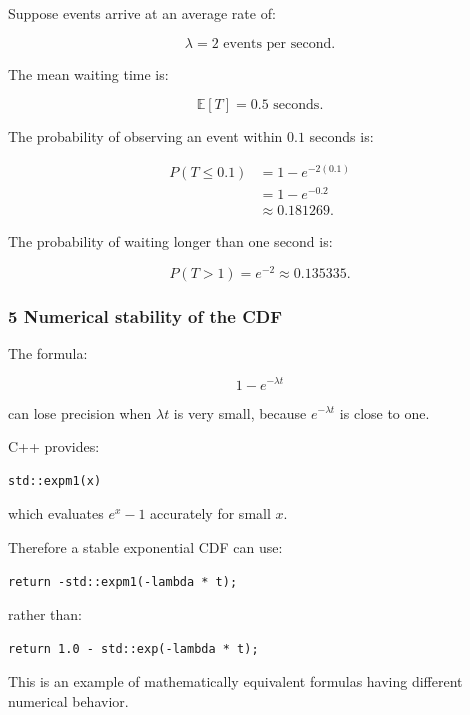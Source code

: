 \hypertarget{02-foundations-ii-ch024-numerical-example-exponential-waiting-times}{}

Suppose events arrive at an average rate of:

\[
 \lambda=2\text{ events per second}.
\]

The mean waiting time is:

\[
 \mathbb E[T]=0.5\text{ seconds}.
\]

The probability of observing an event within \(0.1\) seconds is:

\[
 \begin{aligned} P(T\le0.1) &=1-e^{-2(0.1)}\\ &=1-e^{-0.2}\\ &\approx\boxed{0.181269}. \end{aligned}
\]

The probability of waiting longer than one second is:

\[
 P(T>1)=e^{-2}\approx0.135335.
\]

\subsubsection{5 Numerical stability of the CDF}\label{02-foundations-ii-ch024-numerical-stability-of-the-cdf}

\hypertarget{02-foundations-ii-ch024-numerical-stability-of-the-cdf}{}

The formula:

\[
 1-e^{-\lambda t}
\]

can lose precision when \(\lambda t\) is very small, because \(e^{-\lambda t}\) is close to one.

C++ provides:

\begin{verbatim}
std::expm1(x)
\end{verbatim}

which evaluates \(e^x-1\) accurately for small \(x\).

Therefore a stable exponential CDF can use:

\begin{verbatim}
return -std::expm1(-lambda * t);
\end{verbatim}

rather than:

\begin{verbatim}
return 1.0 - std::exp(-lambda * t);
\end{verbatim}

This is an example of mathematically equivalent formulas having different numerical behavior.

